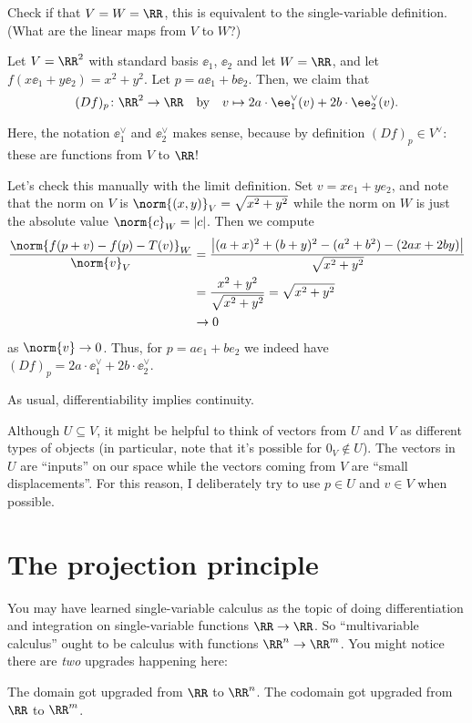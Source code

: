 \begin{ques}
	Check if that $V = W = \RR$, this is equivalent to the single-variable definition.
	(What are the linear maps from $V$ to $W$?)
\end{ques}
\begin{example}[Total derivative of $f(x,y) = x^2+y^2$]
	Let $V = \RR^2$ with standard basis $\ee_1$, $\ee_2$ and let $W = \RR$,
	and let $f\left( x \ee_1 + y \ee_2 \right) = x^2+y^2$.  Let $p = a\ee_1 + b\ee_2$.
	Then, we claim that \[ (Df)_p \colon \RR^2 \to \RR \quad\text{by}\quad
	v \mapsto 2a \cdot \ee_1^\vee(v) + 2b \cdot \ee_2^\vee(v). \]
\end{example}
Here, the notation $\ee_1^\vee$ and $\ee_2^\vee$ makes sense,
because by definition $(Df)_p \in V^\vee$: these are functions from $V$ to $\RR$!

Let's check this manually with the limit definition.
Set $v = xe_1 + ye_2$, and note that the norm on $V$ is $\norm{(x,y)}_V = \sqrt{x^2+y^2}$
while the norm on $W$ is just the absolute value $\norm{c}_W = \left\lvert c \right\rvert$.
Then we compute
\begin{align*}
	\frac{\norm{f(p + v) - f(p) - T(v)}_W}{\norm{v}_V}
	&= \frac{\left\lvert (a+x)^2 + (b+y)^2 - (a^2+b^2) - (2ax+2by) \right\rvert}{\sqrt{x^2+y^2}} \\
	&= \frac{x^2+y^2}{\sqrt{x^2+y^2}} = \sqrt{x^2+y^2} \\
	&\to 0
\end{align*}
as $\norm{v} \to 0$.
Thus, for $p = ae_1 + be_2$ we indeed have $(Df)_p = 2a \cdot \ee_1^\vee + 2b \cdot \ee_2^\vee$.

\begin{remark}
	As usual, differentiability implies continuity.
\end{remark}
\begin{remark}
	Although $U \subseteq V$, it might be helpful to think of vectors from $U$ and $V$
	as different types of objects (in particular, note that it's possible for $0_V \notin U$).
	The vectors in $U$ are ``inputs'' on our space
	while the vectors coming from $V$ are ``small displacements''.
	For this reason, I deliberately try to use $p \in U$ and $v \in V$ when possible.
\end{remark}

\section{The projection principle}
You may have learned single-variable calculus as the topic of doing
differentiation and integration on single-variable functions $\RR \to \RR$.
So ``multivariable calculus'' ought to be calculus with functions $\RR^n \to \RR^m$.
You might notice there are \emph{two} upgrades happening here:
\begin{itemize}
	\ii The domain got upgraded from $\RR$ to $\RR^n$.
	\ii The codomain got upgraded from $\RR$ to $\RR^m$.
\end{itemize}

